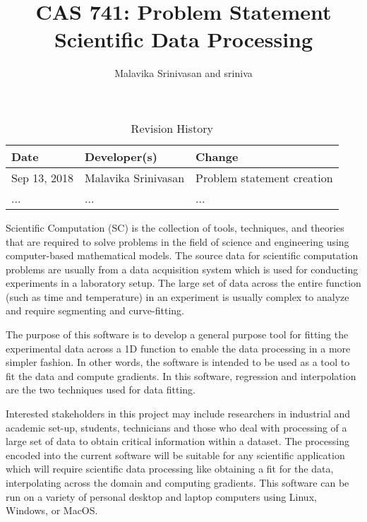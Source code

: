 \documentclass{article}
\title{CAS 741: Problem Statement\\Scientific Data Processing}
\author{Malavika Srinivasan and sriniva}
\date{}
\begin{document}
\maketitle

\begin{table}[hp]
\caption{Revision History} \label{TblRevisionHistory}
\begin{tabularx}{\textwidth}{llX}
\toprule
\textbf{Date} & \textbf{Developer(s)} & \textbf{Change}\\
\midrule
Sep 13, 2018 & Malavika Srinivasan & Problem statement creation\\
... & ... & ...\\
\bottomrule
\end{tabularx}
\end{table}

Scientific Computation (SC) is the collection of tools, techniques, and
theories that are required to solve problems in the field of science and
engineering using computer-based mathematical models. The source data for
scientific computation problems are usually from a data acquisition system
which is used for conducting experiments in a laboratory setup. The large set
of data across the entire function (such as time and temperature) in an
experiment is usually complex to analyze and require segmenting and
curve-fitting.

The purpose of this software is to develop a general purpose tool for fitting
the experimental data across a 1D function to enable the data processing in a
more simpler fashion. In other words, the software is intended to be used as a
tool to fit the data and compute gradients. In this software, regression and
interpolation are the two techniques used for data fitting.

Interested stakeholders in this project may include researchers in industrial
and academic set-up, students, technicians and those who deal with processing
of a large set of data to obtain critical information within a dataset. The
processing encoded into the current software will be suitable for any
scientific application which will require scientific data processing like
obtaining a fit for the data, interpolating across the domain and computing
gradients. This software can be run on a variety of personal desktop and laptop
computers using Linux, Windows, or MacOS.





\end{document}
